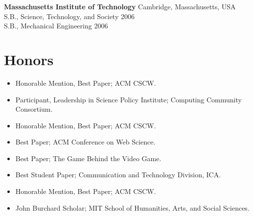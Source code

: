 \documentclass{cv}
\begin{document}
	\textbf{Massachusetts Institute of Technology} \hfill Cambridge, Massachusetts, USA\\
	S.B., Science, Technology, and Society \hfill 2006 \\
	S.B., Mechanical Engineering \hfill 2006


	\section{Honors}
	\begin{itemize}
		\item[\textit{2019}] Honorable Mention, Best Paper; ACM CSCW.

		\item[\textit{2017}] Participant, Leadership in Science Policy Institute; Computing Community Consortium.

		\item[\textit{2015}] Honorable Mention, Best Paper; ACM CSCW.


		\item[\textit{2011}] Best Paper; ACM Conference on Web Science.
		\item[] Best Paper; The Game Behind the Video Game.
		\item[] Best Student Paper; Communication and Technology Division, ICA.

		\item[\textit{2010}] Honorable Mention, Best Paper; ACM CSCW.

		\item[\textit{2005}] John Burchard Scholar; MIT School of Humanities, Arts, and Social Sciences.

	\end{itemize}
\end{document}
